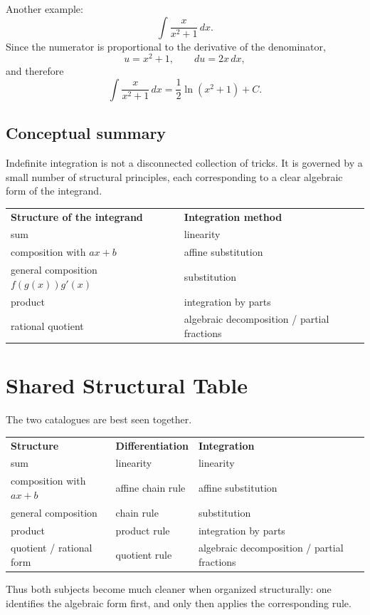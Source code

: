 \documentclass{article}
\begin{document}
	Another example:
	\[
	\int \frac{x}{x^2+1}\,dx.
	\]
	Since the numerator is proportional to the derivative of the denominator,
	\[
	u=x^2+1,\qquad du=2x\,dx,
	\]
	and therefore
	\[
	\int \frac{x}{x^2+1}\,dx
	=
	\frac{1}{2}\ln(x^2+1)+C.
	\]
	
	\subsection{Conceptual summary}
	
	Indefinite integration is not a disconnected collection of tricks.  
	It is governed by a small number of structural principles, each corresponding to a clear algebraic form of the integrand.
	
	\begin{center}
		\begin{tabular}{ll}
			\textbf{Structure of the integrand} & \textbf{Integration method} \\[4pt]
			sum & linearity \\[4pt]
			composition with \(ax+b\) & affine substitution \\[4pt]
			general composition \(f(g(x))g'(x)\) & substitution \\[4pt]
			product & integration by parts \\[4pt]
			rational quotient & algebraic decomposition / partial fractions
		\end{tabular}
	\end{center}
	
	\vspace{1em}
	
	\section{Shared Structural Table}
	
	The two catalogues are best seen together.
	
	\begin{center}
		\begin{tabular}{lll}
			\textbf{Structure} & \textbf{Differentiation} & \textbf{Integration} \\[4pt]
			sum & linearity & linearity \\[4pt]
			composition with \(ax+b\) & affine chain rule & affine substitution \\[4pt]
			general composition & chain rule & substitution \\[4pt]
			product & product rule & integration by parts \\[4pt]
			quotient / rational form & quotient rule & algebraic decomposition / partial fractions
		\end{tabular}
	\end{center}
	
	Thus both subjects become much cleaner when organized structurally: one identifies the algebraic form first, and only then applies the corresponding rule.
	
\end{document}

